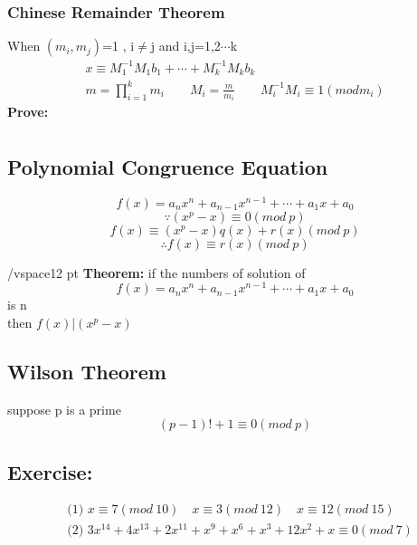 \documentclass{ctexart}
\begin{document}
\vspace{12 pt}
\subsubsection{Chinese Remainder Theorem}
 When \((m_i,m_j)\)=1 , i\(\neq\)j and i,j=1,2\(\cdots\)k
\begin{align*}
x\equiv M^{-1}_1M_1b_1+\cdots+M^{-1}_kM_kb_k\\
m=\prod_{i=1}^{k}{m_i}\qquad M_i=\frac{m}{m_i} \qquad M_i^{-1}M_i\equiv 1(mod m_i)
\end{align*}
\vspace{12 pt}
\textbf{Prove:}
\begin{align*}
\end{align*}

\vspace{12 pt}

\subsection{Polynomial Congruence Equation}
\[f(x)=a_nx^n+a_{n-1}x^{n-1}+\cdots +a_1x+a_0\]
\[\because (x^p-x)\equiv 0(mod\ p) \] 
\[ f(x)\equiv (x^p-x)q(x)+r(x)(mod\ p)\]
\[\therefore f(x)\equiv r(x)(mod\ p)\]

/vspace{12 pt}
\textbf{Theorem:}
if the numbers of solution of 
\[f(x)=a_nx^n+a_{n-1}x^{n-1}+\cdots +a_1x+a_0\]
is n\\
then \(f(x)\)\(\mid\)\((x^p-x)\)

\vspace{12 pt}
\subsection{Wilson Theorem}
suppose p is a prime
\[(p-1)!+1\equiv 0(mod\ p)\]

\vspace{12 pt}
\subsection{Exercise:}
\begin{align*}
&\text{(1) } x\equiv 7(mod\ 10)\quad x\equiv 3(mod\ 12)\quad x\equiv 12(mod\ 15)\\
&\text{(2) } 3x^{14}+4x^{13}+2x^{11}+x^{9}+x^{6}+x^3+12x^2+x\equiv 0(mod\ 7)
\end{align*}
\end{document}
